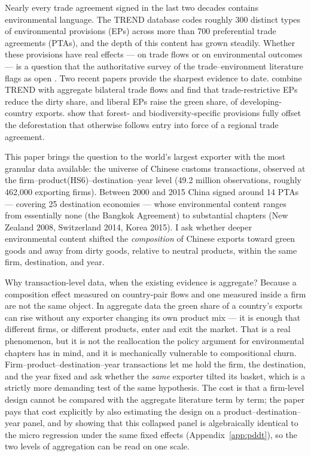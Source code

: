 \documentclass[12pt]{article}
\begin{document}
Nearly every trade agreement signed in the last two decades contains environmental
language. The TREND database \citep{morin2018} codes roughly 300 distinct types of
environmental provisions (EPs) across more than 700 preferential trade agreements (PTAs),
and the depth of this content has grown steadily. Whether these provisions have real
effects --- on trade flows or on environmental outcomes --- is a question that the
authoritative survey of the trade--environment literature flags as open
\citep{copeland2022}. Two recent papers provide the sharpest evidence to date.
\citet{brandi2020} combine TREND with aggregate bilateral trade flows and find that
trade-restrictive EPs reduce the dirty share, and liberal EPs raise the green share, of
developing-country exports. \citet{abman2024} show that forest- and biodiversity-specific
provisions fully offset the deforestation that otherwise follows entry into force of a
regional trade agreement.

This paper brings the question to the world's largest exporter with the most granular data
available: the universe of Chinese customs transactions, observed at the
firm--product(HS6)--destination--year level (49.2 million observations, roughly 462{,}000
exporting firms). Between 2000 and 2015 China signed around 14 PTAs --- covering 25
destination economies --- whose environmental content ranges from essentially none (the
Bangkok Agreement) to substantial chapters (New Zealand 2008, Switzerland 2014, Korea
2015). I ask whether deeper environmental content shifted the \emph{composition} of
Chinese exports toward green goods and away from dirty goods, relative to neutral
products, within the same firm, destination, and year.

Why transaction-level data, when the existing evidence is aggregate? Because a
composition effect measured on country-pair flows and one measured inside a firm are not
the same object. In aggregate data the green share of a country's exports can rise
without any exporter changing its own product mix --- it is enough that different firms,
or different products, enter and exit the market. That is a real phenomenon, but it is
not the reallocation the policy argument for environmental chapters has in mind, and it
is mechanically vulnerable to compositional churn. Firm--product--destination--year
transactions let me hold the firm, the destination, and the year fixed and ask whether
the \emph{same} exporter tilted its basket, which is a strictly more demanding test of
the same hypothesis. The cost is that a firm-level design cannot be compared with the
aggregate literature term by term; the paper pays that cost explicitly by also estimating
the design on a product--destination--year panel, and by showing that this collapsed
panel is algebraically identical to the micro regression under the same fixed effects
(Appendix~\ref{app:pddt}), so the two levels of aggregation can be read on one scale.
\end{document}
